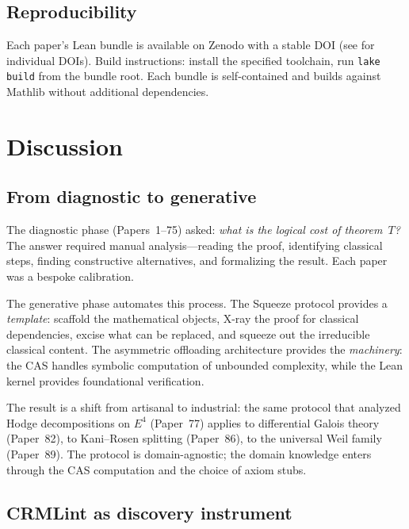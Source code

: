 \documentclass[11pt]{article}
\theoremstyle{plain}
\theoremstyle{definition}
\theoremstyle{remark}
\begin{document}
\subsection{Reproducibility}

Each paper's Lean bundle is available on Zenodo with a stable DOI
(see  for individual DOIs).  Build
instructions: install the specified toolchain, run \texttt{lake build}
from the bundle root.  Each bundle is self-contained and builds
against Mathlib without additional dependencies.


\section{Discussion}\label{sec:discussion}

\subsection{From diagnostic to generative}

The diagnostic phase (Papers~1--75) asked: \emph{what is the
logical cost of theorem~$T$?}  The answer required manual
analysis---reading the proof, identifying classical steps,
finding constructive alternatives, and formalizing the result.
Each paper was a bespoke calibration.

The generative phase automates this process.  The Squeeze protocol
provides a \emph{template}: scaffold the mathematical objects,
X-ray the proof for classical dependencies, excise what can be
replaced, and squeeze out the irreducible classical content.  The
asymmetric offloading architecture provides the \emph{machinery}:
the CAS handles symbolic computation of unbounded complexity,
while the Lean kernel provides foundational verification.

The result is a shift from artisanal to industrial: the same
protocol that analyzed Hodge decompositions on $E^4$ (Paper~77)
applies to differential Galois theory (Paper~82), to
Kani--Rosen splitting (Paper~86), to the universal Weil family
(Paper~89).  The protocol is domain-agnostic; the domain knowledge
enters through the CAS computation and the choice of axiom stubs.

\subsection{CRMLint as discovery instrument}
\end{document}
